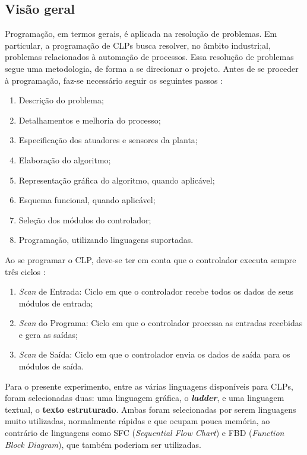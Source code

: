 \subsection{Visão geral}
Programação, em termos gerais, é aplicada na resolução de problemas. Em particular, a programação de CLPs busca resolver, no âmbito industri;al, problemas relacionados à automação de processos. Essa resolução de problemas segue uma metodologia, de forma a se direcionar o projeto. Antes de se proceder à programação, faz-se necessário seguir os seguintes passos \cite{rockwellAutomation}:
\begin{enumerate}
  \item Descrição do problema;
  \item Detalhamentos e melhoria do processo;
  \item Especificação dos atuadores e sensores da planta;
  \item Elaboração do algoritmo;
  \item Representação gráfica do algoritmo, quando aplicável;
  \item Esquema funcional, quando aplicável;
  \item Seleção dos módulos do controlador;
  \item Programação, utilizando linguagens suportadas.
\end{enumerate}

Ao se programar o CLP, deve-se ter em conta que o controlador executa sempre três ciclos \cite{rockwellAutomation}:
\begin{enumerate}
  \item \textit{Scan} de Entrada: Ciclo em que o controlador recebe todos os dados de seus módulos de entrada;
  \item \textit{Scan} do Programa: Ciclo em que o controlador processa as entradas recebidas e gera as saídas;
  \item \textit{Scan} de Saída: Ciclo em que o controlador envia os dados de saída para os módulos de saída.
\end{enumerate}

Para o presente experimento, entre as várias linguagens disponíveis para CLPs, foram selecionadas duas: uma linguagem gráfica, o \textbf{\textit{ladder}}, e uma linguagem textual, o \textbf{texto estruturado}. Ambas foram selecionadas por serem linguagens muito utilizadas, normalmente rápidas e que ocupam pouca memória, ao contrário de linguagens como SFC (\textit{Sequential Flow Chart}) e FBD (\textit{Function Block Diagram}), que também poderiam ser utilizadas.

